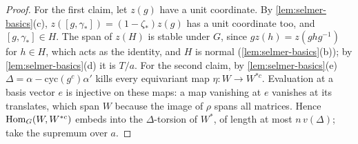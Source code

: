 \begin{proof}
For the first claim, let $z(g)$ have a unit coordinate. By \cref{lem:selmer-basics}(c), $z([g,\gamma_*])=(1-\zeta_*)z(g)$ has a unit coordinate too, and $[g,\gamma_*]\in H$. The span of $z(H)$ is stable under $G$, since $gz(h)=z(ghg^{-1})$ for $h\in H$, which acts as the identity, and $H$ is normal (\cref{lem:selmer-basics}(b)); by
\cref{lem:selmer-basics}(d) it is $T/a$. For the second claim, by \cref{lem:selmer-basics}(e) $\Delta=\alpha-\mathrm{cyc}(g^c)\alpha'$ kills every equivariant map $\eta\colon W\to W^{*c}$. Evaluation at a basis vector $e$ is injective on these maps: a map vanishing at $e$ vanishes at its translates, which span $W$ because the image of
$\rho$ spans all matrices. Hence $\operatorname{Hom}_G(W,W^{*c})$ embeds into the $\Delta$-torsion of $W^*$, of length at most $n\,v(\Delta)$; take the supremum over $a$.
\end{proof}

